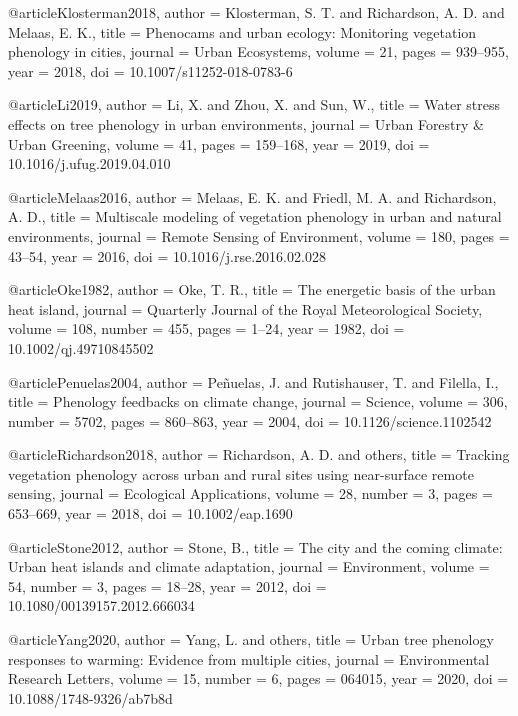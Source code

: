 @article{Klosterman2018,
  author  = {Klosterman, S. T. and Richardson, A. D. and Melaas, E. K.},
  title   = {Phenocams and urban ecology: Monitoring vegetation phenology in cities},
  journal = {Urban Ecosystems},
  volume  = {21},
  pages   = {939--955},
  year    = {2018},
  doi     = {10.1007/s11252-018-0783-6}
}

@article{Li2019,
  author  = {Li, X. and Zhou, X. and Sun, W.},
  title   = {Water stress effects on tree phenology in urban environments},
  journal = {Urban Forestry \& Urban Greening},
  volume  = {41},
  pages   = {159--168},
  year    = {2019},
  doi     = {10.1016/j.ufug.2019.04.010}
}

@article{Melaas2016,
  author  = {Melaas, E. K. and Friedl, M. A. and Richardson, A. D.},
  title   = {Multiscale modeling of vegetation phenology in urban and natural environments},
  journal = {Remote Sensing of Environment},
  volume  = {180},
  pages   = {43--54},
  year    = {2016},
  doi     = {10.1016/j.rse.2016.02.028}
}

@article{Oke1982,
  author  = {Oke, T. R.},
  title   = {The energetic basis of the urban heat island},
  journal = {Quarterly Journal of the Royal Meteorological Society},
  volume  = {108},
  number  = {455},
  pages   = {1--24},
  year    = {1982},
  doi     = {10.1002/qj.49710845502}
}

@article{Penuelas2004,
  author  = {Pe\~{n}uelas, J. and Rutishauser, T. and Filella, I.},
  title   = {Phenology feedbacks on climate change},
  journal = {Science},
  volume  = {306},
  number  = {5702},
  pages   = {860--863},
  year    = {2004},
  doi     = {10.1126/science.1102542}
}

@article{Richardson2018,
  author  = {Richardson, A. D. and others},
  title   = {Tracking vegetation phenology across urban and rural sites using near-surface remote sensing},
  journal = {Ecological Applications},
  volume  = {28},
  number  = {3},
  pages   = {653--669},
  year    = {2018},
  doi     = {10.1002/eap.1690}
}

@article{Stone2012,
  author  = {Stone, B.},
  title   = {The city and the coming climate: Urban heat islands and climate adaptation},
  journal = {Environment},
  volume  = {54},
  number  = {3},
  pages   = {18--28},
  year    = {2012},
  doi     = {10.1080/00139157.2012.666034}
}

@article{Yang2020,
  author  = {Yang, L. and others},
  title   = {Urban tree phenology responses to warming: Evidence from multiple cities},
  journal = {Environmental Research Letters},
  volume  = {15},
  number  = {6},
  pages   = {064015},
  year    = {2020},
  doi     = {10.1088/1748-9326/ab7b8d}
}

